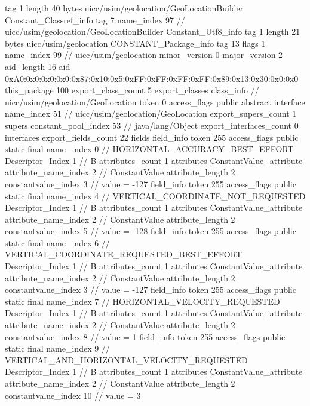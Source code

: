{{{			tag	1
			length	40
			bytes	uicc/usim/geolocation/GeoLocationBuilder
		}
		Constant_Classref_info {
			tag	7
			name_index	97		// uicc/usim/geolocation/GeoLocationBuilder
		}
		Constant_Utf8_info {
			tag	1
			length	21
			bytes	uicc/usim/geolocation
		}
		CONSTANT_Package_info {
			tag	13
			flags	1
			name_index	99		// uicc/usim/geolocation
			minor_version	0
			major_version	2
			aid_length	16
			aid	0xA0:0x0:0x0:0x0:0x87:0x10:0x5:0xFF:0xFF:0xFF:0xFF:0x89:0x13:0x30:0x0:0x0
		}
	}
	this_package	100
	export_class_count	5
	export_classes {
		class_info {		// uicc/usim/geolocation/GeoLocation
			token	0
			access_flags	public abstract interface
			name_index	51		// uicc/usim/geolocation/GeoLocation
			export_supers_count	1
			supers {
				constant_pool_index	53		// java/lang/Object
			}
			export_interfaces_count	0
			interfaces {
			}
			export_fields_count	22
			fields {
			field_info {
				token	255
				access_flags	public static final
				name_index	0		// HORIZONTAL_ACCURACY_BEST_EFFORT
				Descriptor_Index	1		// B
				attributes_count	1
				attributes {
				ConstantValue_attribute {
					attribute_name_index	2		// ConstantValue
					attribute_length	2
					constantvalue_index	3		// value = -127
				}
				}
			}
			field_info {
				token	255
				access_flags	public static final
				name_index	4		// VERTICAL_COORDINATE_NOT_REQUESTED
				Descriptor_Index	1		// B
				attributes_count	1
				attributes {
				ConstantValue_attribute {
					attribute_name_index	2		// ConstantValue
					attribute_length	2
					constantvalue_index	5		// value = -128
				}
				}
			}
			field_info {
				token	255
				access_flags	public static final
				name_index	6		// VERTICAL_COORDINATE_REQUESTED_BEST_EFFORT
				Descriptor_Index	1		// B
				attributes_count	1
				attributes {
				ConstantValue_attribute {
					attribute_name_index	2		// ConstantValue
					attribute_length	2
					constantvalue_index	3		// value = -127
				}
				}
			}
			field_info {
				token	255
				access_flags	public static final
				name_index	7		// HORIZONTAL_VELOCITY_REQUESTED
				Descriptor_Index	1		// B
				attributes_count	1
				attributes {
				ConstantValue_attribute {
					attribute_name_index	2		// ConstantValue
					attribute_length	2
					constantvalue_index	8		// value = 1
				}
				}
			}
			field_info {
				token	255
				access_flags	public static final
				name_index	9		// VERTICAL_AND_HORIZONTAL_VELOCITY_REQUESTED
				Descriptor_Index	1		// B
				attributes_count	1
				attributes {
				ConstantValue_attribute {
					attribute_name_index	2		// ConstantValue
					attribute_length	2
					constantvalue_index	10		// value = 3
}}}}}}}
